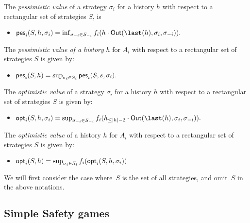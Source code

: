 \begin{definition}[Values] The \emph{pessimistic value} of a strategy
\(\sigma_i\) for a history \(h\) with respect to a rectangular set of
strategies \(S\), is

\begin{itemize}
\item   \(\pes_i(S,h,\sigma_i) = \inf_{\sigma_{-i} \in S_{-i}} \payoff_{i}(h \cdot \Out(\last(h), \sigma_i,\sigma_{-i})).\)
\end{itemize}

The \emph{pessimistic value of a history} \(h\) for \(A_i\) with respect
to a rectangular set of strategies \(S\) is given by:

\begin{itemize}

\item   \(\textsf{pes}_i(S,h) = \sup_{\sigma_i \in S_i} \textsf{pes}_i(S,s,\sigma_i).\)
\end{itemize}

The \emph{optimistic value} of a strategy \(\sigma_i\) for a history
\(h\) with respect to a rectangular set of strategies \(S\) is given by:

\begin{itemize}

\item   \(\opt_i(S,h,\sigma_i) = \sup_{\sigma_{-i} \in S_{-i}} \payoff_i (h_{\le |h|-2} \cdot \Out(\last(h), \sigma_i,\sigma_{-i})).\)
\end{itemize}

The \emph{optimistic value} of a history \(h\) for \(A_{i}\) with
respect to a rectangular set of strategies \(S\) is given by:

\begin{itemize}

\item   \(\textsf{opt}_i(S,h) = \sup_{\sigma_i \in S_i} f_{i}(\textsf{opt}_i(S,h,\sigma_i))\)
\end{itemize}
\end{definition}

We will first consider the case where~$S$ is the set of all strategies,
and omit~$S$ in the above notations.

\subsection{Simple Safety games}\label{simple-safety-games}

